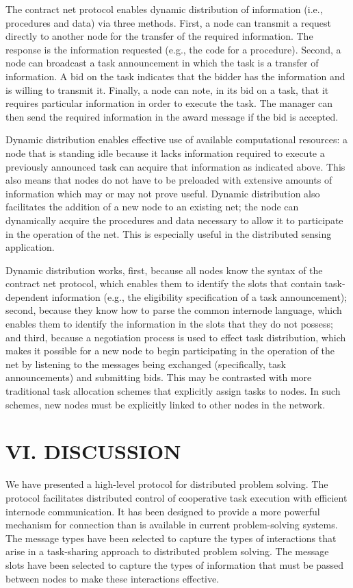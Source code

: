 \documentclass[
]{article}
\begin{document}
The contract net protocol enables dynamic distribution of information
(i.e., procedures and data) via three methods. First, a node can
transmit a request directly to another node for the transfer of the
required information. The response is the information requested (e.g.,
the code for a procedure). Second, a node can broadcast a task
announcement in which the task is a transfer of information. A bid on
the task indicates that the bidder has the information and is willing to
transmit it. Finally, a node can note, in its bid on a task, that it
requires particular information in order to execute the task. The
manager can then send the required information in the award message if
the bid is accepted.

Dynamic distribution enables effective use of available computational
resources: a node that is standing idle because it lacks information
required to execute a previously announced task can acquire that
information as indicated above. This also means that nodes do not have
to be preloaded with extensive amounts of information which may or may
not prove useful. Dynamic distribution also facilitates the addition of
a new node to an existing net; the node can dynamically acquire the
procedures and data necessary to allow it to participate in the
operation of the net. This is especially useful in the distributed
sensing application.

Dynamic distribution works, first, because all nodes know the syntax of
the contract net protocol, which enables them to identify the slots that
contain task-dependent information (e.g., the eligibility specification
of a task announcement); second, because they know how to parse the
common internode language, which enables them to identify the
information in the slots that they do not possess; and third, because a
negotiation process is used to effect task distribution, which makes it
possible for a new node to begin participating in the operation of the
net by listening to the messages being exchanged (specifically, task
announcements) and submitting bids. This may be contrasted with more
traditional task allocation schemes that explicitly assign tasks to
nodes. In such schemes, new nodes must be explicitly linked to other
nodes in the network.

\section{VI. DISCUSSION}\label{vi.-discussion}

We have presented a high-level protocol for distributed problem solving.
The protocol facilitates distributed control of cooperative task
execution with efficient internode communication. It has been designed
to provide a more powerful mechanism for connection than is available in
current problem-solving systems. The message types have been selected to
capture the types of interactions that arise in a task-sharing approach
to distributed problem solving. The message slots have been selected to
capture the types of information that must be passed between nodes to
make these interactions effective.
\end{document}
